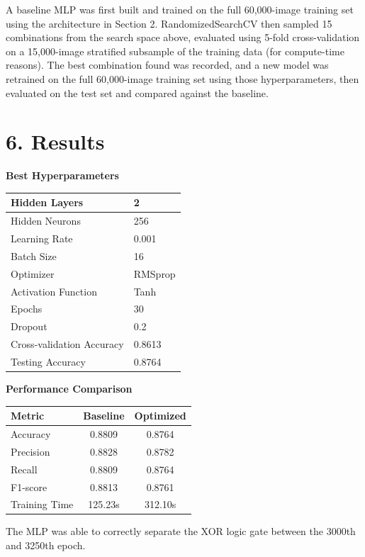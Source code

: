 \documentclass[11pt]{article}
\begin{document}
A baseline MLP was first built and trained on the full 60,000-image training set using the architecture in Section 2. RandomizedSearchCV then sampled 15 combinations from the search space above, evaluated using 5-fold cross-validation on a 15,000-image stratified subsample of the training data (for compute-time reasons). The best combination found was recorded, and a new model was retrained on the full 60,000-image training set using those hyperparameters, then evaluated on the test set and compared against the baseline.

\section*{6. Results}

\textbf{Best Hyperparameters}

\begin{tabular}{|p{6cm}|p{6cm}|}
\hline
Hidden Layers & 2\\\hline
Hidden Neurons & 256\\\hline
Learning Rate & 0.001\\\hline
Batch Size & 16\\\hline
Optimizer & RMSprop\\\hline
Activation Function & Tanh\\\hline
Epochs & 30\\\hline
Dropout & 0.2\\\hline
Cross-validation Accuracy & 0.8613\\\hline
Testing Accuracy & 0.8764\\\hline
\end{tabular}

\vspace{3mm}

\textbf{Performance Comparison}

\begin{tabular}{|p{4cm}|c|c|}
\hline
Metric & Baseline & Optimized\\
\hline
Accuracy&0.8809&0.8764\\
Precision&0.8828&0.8782\\
Recall&0.8809&0.8764\\
F1-score&0.8813&0.8761\\
Training Time&125.23s&312.10s\\
\hline
\end{tabular}

\vspace{3mm}

The MLP was able to correctly separate the XOR logic gate between the 3000th and 3250th epoch.
\end{document}
